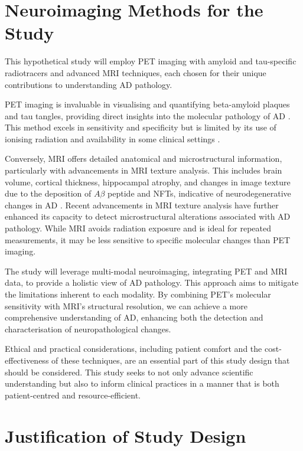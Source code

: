 \documentclass[10pt]{article}
\begin{document}
\begin{sloppypar}
  \section{Neuroimaging Methods for the Study}
  \label{sec:neuroimaging-methods}

  This hypothetical study will employ PET imaging with amyloid and tau-specific radiotracers and advanced MRI techniques, each chosen for their unique contributions to understanding AD pathology.

  PET imaging is invaluable in visualising and quantifying beta-amyloid plaques and tau tangles, providing direct insights into the molecular pathology of AD \citep{jack_serial_2009}. This method excels in sensitivity and specificity but is limited by its use of ionising radiation and availability in some clinical settings \citep{bao_pet_2021}.

  Conversely, MRI offers detailed anatomical and microstructural information, particularly with advancements in MRI texture analysis. This includes brain volume, cortical thickness, hippocampal atrophy, and changes in image texture due to the deposition of $A\beta$ peptide and NFTs, indicative of neurodegenerative changes in AD \citep{cai_magnetic_2020}. Recent advancements in MRI texture analysis have further enhanced its capacity to detect microstructural alterations associated with AD pathology. While MRI avoids radiation exposure and is ideal for repeated measurements, it may be less sensitive to specific molecular changes than PET imaging.

  The study will leverage multi-modal neuroimaging, integrating PET and MRI data, to provide a holistic view of AD pathology. This approach aims to mitigate the limitations inherent to each modality. By combining PET’s molecular sensitivity with MRI’s structural resolution, we can achieve a more comprehensive understanding of AD, enhancing both the detection and characterisation of neuropathological changes.

  Ethical and practical considerations, including patient comfort and the cost-effectiveness of these techniques, are an essential part of this study design that should be considered. This study seeks to not only advance scientific understanding but also to inform clinical practices in a manner that is both patient-centred and resource-efficient.

  \section{Justification of Study Design}
  \label{sec:justification-of-study-design}


\end{sloppypar}
\end{document}
